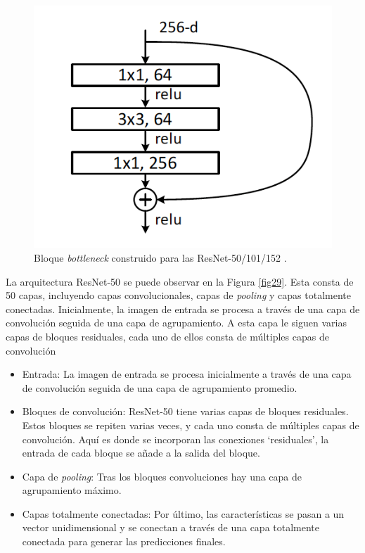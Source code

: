 \begin{figure}[h]
	\centering
	\includegraphics[scale=0.65]{imagenes/cap4/residual_conections.png}
	\caption[Bloque residual ResNet.]{Bloque \textit{bottleneck} construido para las ResNet-50/101/152 \cite{73}.}
	\label{fig28}
\end{figure}

La arquitectura ResNet-50 se puede observar en la Figura \ref{fig29}. Esta consta de 50 capas, incluyendo capas convolucionales, capas de \textit{pooling} y capas totalmente conectadas. Inicialmente, la imagen de entrada se procesa a través de una capa de convolución seguida de una capa de agrupamiento. A esta capa le siguen varias capas de bloques residuales, cada uno de ellos consta de múltiples capas de convolución

\begin{itemize}
	\item Entrada: La imagen de entrada se procesa inicialmente a través de una capa de convolución seguida de una capa de agrupamiento promedio.
	\item Bloques de convolución: ResNet-50 tiene varias capas de bloques residuales. Estos bloques se repiten varias veces, y cada uno consta de múltiples capas de convolución. Aquí es donde se incorporan las conexiones \enquote*{residuales}, la entrada de cada bloque se añade a la salida del bloque.
	\item Capa de \textit{pooling}: Tras los bloques convoluciones hay una capa de agrupamiento máximo.
	\item Capas totalmente conectadas: Por último, las características se pasan a un vector unidimensional y se conectan a través de una capa totalmente conectada para generar las predicciones finales.
\end{itemize}

